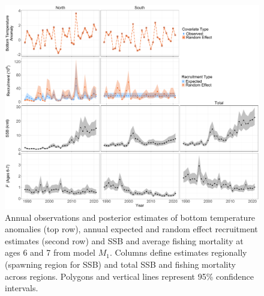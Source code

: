 \documentclass[
]{article}
\begin{document}
\begin{figure}

{\centering \includegraphics[height=0.95\textheight]{E_R_SSB_F_fig} 

}

\caption{Annual observations and posterior estimates of bottom temperature anomalies (top row), annual expected and random effect recruitment estimates (second row) and SSB and average fishing mortality at ages 6 and 7 from model $M_1$. Columns define estimates regionally (spawning region for SSB) and total SSB and fishing mortality across regions. Polygons and vertical lines represent 95\% confidence intervals.}\label{fig:E-R-SSB-F}
\end{figure}
\pagebreak
\end{document}
